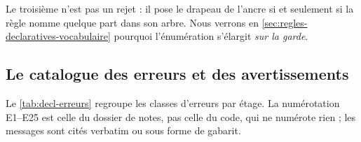 Le troisième n'est pas un rejet : il pose le drapeau  de l'ancre  si et seulement si la règle nomme  quelque part dans son arbre. Nous verrons en \cref{sec:regles-declaratives-vocabulaire} pourquoi l'énumération s'élargit \emph{sur la garde}.

\subsection{Le catalogue des erreurs et des avertissements}

Le \cref{tab:decl-erreurs} regroupe les classes d'erreurs par étage. La numérotation E1--E25 est celle du dossier de notes, pas celle du code, qui ne numérote rien ; les messages sont cités verbatim ou sous forme de gabarit.

